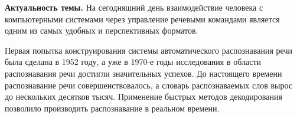 \textbf{Актуальность темы.}
На сегодняшний день взаимодействие человека с компьютерными системами через управление речевыми командами является одним из самых удобных и перспективных форматов.

Первая попытка конструирования системы автоматического распознавания речи была сделана в 1952 году, а уже в 1970-е годы исследования в области распознавания речи достигли значительных успехов.
До настоящего времени распознавание речи совершенствовалось, а словарь распознаваемых слов вырос до нескольких десятков тысяч.
Применение быстрых методов декодирования позволило производить распознавание в реальном времени.


